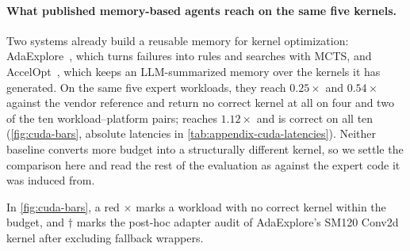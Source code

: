 \paragraph{What published memory-based agents reach on the same five kernels.}
Two systems already build a reusable memory for kernel optimization: AdaExplore~\citep{adaexplore}, which turns failures into rules and searches with MCTS, and AccelOpt~\citep{accelopt}, which keeps an LLM-summarized memory over the kernels it has generated. On the same five expert workloads, they reach $0.25\times$ and $0.54\times$ against the vendor reference and return no correct kernel at all on four and two of the ten workload--platform pairs; \sys{} reaches $1.12\times$ and is correct on all ten (\autoref{fig:cuda-bars}, absolute latencies in \autoref{tab:appendix-cuda-latencies}). Neither baseline converts more budget into a structurally different kernel, so we settle the comparison here and read the rest of the evaluation as \sys{} against the expert code it was induced from.

In \autoref{fig:cuda-bars}, a red $\times$ marks a workload with no correct kernel within the budget, and $\dagger$ marks the post-hoc adapter audit of AdaExplore's SM120 Conv2d kernel after excluding fallback wrappers.

